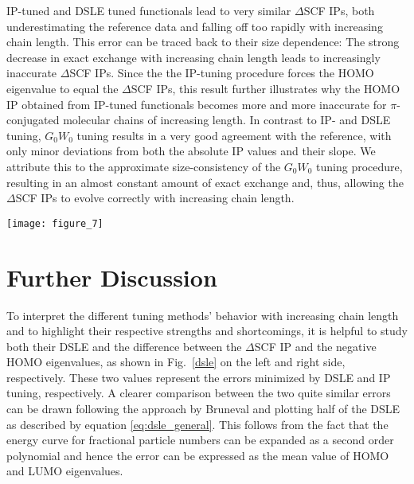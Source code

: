 \documentclass[journal=jctcce,manuscript=article,layout=twocolumn]{achemso}
\begin{document}
IP-tuned and DSLE tuned functionals lead to very similar $\Delta$SCF IPs, both underestimating the reference data and falling off too rapidly with increasing chain length. This error can be traced back to their size dependence: The strong decrease in exact exchange with increasing chain length leads to increasingly inaccurate $\Delta$SCF IPs. Since the the IP-tuning procedure forces the HOMO eigenvalue to equal the $\Delta$SCF IPs, this result further illustrates why the HOMO IP obtained from IP-tuned functionals becomes more and more inaccurate for $\pi$-conjugated molecular chains of increasing length.
In contrast to IP- and DSLE tuning, $G_0W_0$ tuning results in a very good agreement with the reference, with only minor deviations from both the absolute IP values and their slope. We attribute this to the approximate size-consistency of the $G_0W_0$ tuning procedure, resulting in an almost constant amount of exact exchange and, thus, allowing the $\Delta$SCF IPs to evolve correctly with increasing chain length. 

\begin{figure*}[tbh]
\texttt{[image: figure\_7]}
\caption{0.5 * DSLE (left) and difference between $\Delta$SCF and eigenvalue IPs (right) for  IP-tuned, $G_0W_0$ tuned and DSLE tuned PBEh, as well as PBE and HF for polyacetylene oligomers of increasing chain length. The unfilled
symbols represent the data for the underlaying DFT calculations, while the filled symbols show the data after a $G_0W_0$ correction.\label{dsle}}
\end{figure*}
\section{Further Discussion}
To interpret the different tuning methods' behavior with increasing chain length and to highlight their respective strengths and shortcomings, it is helpful to study both their DSLE and the difference between the $\Delta$SCF IP
and the negative HOMO eigenvalues, as shown in Fig.~\ref{dsle} on the left and right side, respectively. These two values represent the errors minimized by DSLE and IP tuning, respectively. 
A clearer comparison between the two quite similar errors can be drawn following the approach by Bruneval\cite{PhysRevLett.103.176403} and plotting half of the DSLE as described by equation \ref{eq:dsle_general}.
This follows from the fact that the
energy curve for fractional particle numbers can be expanded as a second order polynomial and hence the error can be expressed as the mean value of HOMO and LUMO eigenvalues. 
\end{document}

